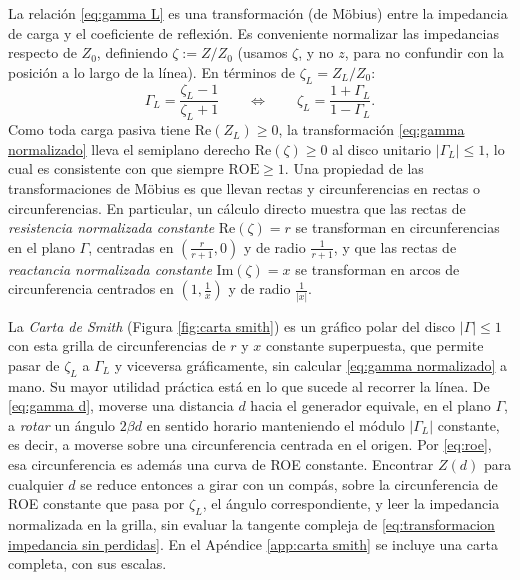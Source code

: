 La relación \eqref{eq:gamma L} es una transformación (de Möbius) entre la impedancia de carga y el coeficiente de reflexión. Es conveniente normalizar las impedancias respecto de $Z_0$, definiendo $\zeta:=Z/Z_0$ (usamos $\zeta$, y no $z$, para no confundir con la posición a lo largo de la línea). En términos de $\zeta_L=Z_L/Z_0$:
\begin{equation}\label{eq:gamma normalizado}
    \Gamma_L = \frac{\zeta_L - 1}{\zeta_L + 1} \qquad\Longleftrightarrow\qquad \zeta_L = \frac{1+\Gamma_L}{1-\Gamma_L}.
\end{equation}
Como toda carga pasiva tiene $\mathrm{Re}(Z_L)\geqslant 0$, la transformación \eqref{eq:gamma normalizado} lleva el semiplano derecho $\mathrm{Re}(\zeta)\geqslant 0$ al disco unitario $|\Gamma_L|\leqslant 1$, lo cual es consistente con que siempre $\mathrm{ROE}\geqslant 1$. Una propiedad de las transformaciones de Möbius es que llevan rectas y circunferencias en rectas o circunferencias. En particular, un cálculo directo muestra que las rectas de \emph{resistencia normalizada constante} $\mathrm{Re}(\zeta)=r$ se transforman en circunferencias en el plano $\Gamma$, centradas en $\left(\frac{r}{r+1},0\right)$ y de radio $\frac{1}{r+1}$, y que las rectas de \emph{reactancia normalizada constante} $\mathrm{Im}(\zeta)=x$ se transforman en arcos de circunferencia centrados en $\left(1,\frac{1}{x}\right)$ y de radio $\frac{1}{|x|}$.

La \emph{Carta de Smith} (Figura \ref{fig:carta smith}) es un gráfico polar del disco $|\Gamma|\leqslant 1$ con esta grilla de circunferencias de $r$ y $x$ constante superpuesta, que permite pasar de $\zeta_L$ a $\Gamma_L$ y viceversa gráficamente, sin calcular \eqref{eq:gamma normalizado} a mano. Su mayor utilidad práctica está en lo que sucede al recorrer la línea. De \eqref{eq:gamma d}, moverse una distancia $d$ hacia el generador equivale, en el plano $\Gamma$, a \emph{rotar} un ángulo $2\beta d$ en sentido horario manteniendo el módulo $|\Gamma_L|$ constante, es decir, a moverse sobre una circunferencia centrada en el origen. Por \eqref{eq:roe}, esa circunferencia es además una curva de ROE constante. Encontrar $Z(d)$ para cualquier $d$ se reduce entonces a girar con un compás, sobre la circunferencia de ROE constante que pasa por $\zeta_L$, el ángulo correspondiente, y leer la impedancia normalizada en la grilla, sin evaluar la tangente compleja de \eqref{eq:transformacion impedancia sin perdidas}. En el Apéndice \ref{app:carta smith} se incluye una carta completa, con sus escalas.%

